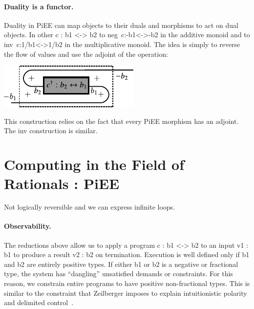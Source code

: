 \documentclass[preprint]{sigplanconf}
\begin{document}
\paragraph*{Duality is a functor.}
Duality in {{PiEE}} can map objects to their duals and morphisms
to act on dual objects. In other {{c : b1 <-> b2}} to
{{neg~c:-b1<->-b2}} in the additive monoid and to
{{inv~c:1/b1<->1/b2}} in the multiplicative monoid. 
The idea is simply to reverse the flow of values and use the
adjoint of the operation:
\begin{multicols}{2}
\begin{center}
  \includegraphics{diagrams/neg_lift.pdf}
\end{center}  

\end{multicols}

This construction relies on the fact that every {{PiEE}} morphism
has an adjoint.  The {{inv}} construction is similar.


\section{Computing in the Field of Rationals : {{PiEE}} }

Not logically reversible and we can express infinite loops.

\paragraph*{Observability.} 

The reductions above allow us to apply a program {{c : b1 <-> b2}} to an
input {{v1 : b1}} to produce a result {{v2 : b2}} on termination. Execution
is well defined only if {{b1}} and {{b2}} are entirely positive types. If
either {{b1}} or {{b2}} is a negative or fractional type, the system has
``dangling'' unsatisfied demands or constraints. For this reason, we
constrain entire programs to have positive non-fractional types. This is
similar to the constraint that Zeilberger imposes to explain intuitionistic
polarity and delimited control~\cite{10.1109/LICS.2010.23}.
\end{document}
